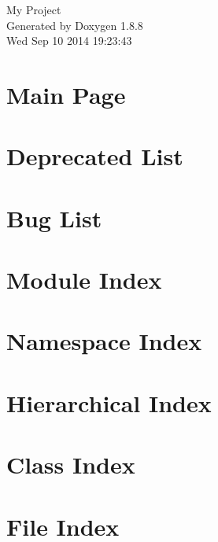 \documentclass[twoside]{book}
\newcommand{\+}{\discretionary{\mbox{\scriptsize$\hookleftarrow$}}{}{}}
\newcommand{\clearemptydoublepage}{%
  \newpage{\pagestyle{empty}\cleardoublepage}%
}
\begin{document}
\hypersetup{pageanchor=false,
             bookmarks=true,
             bookmarksnumbered=true,
             pdfencoding=unicode
            }
\begin{titlepage}
\vspace*{7cm}
\begin{center}%
{\Large My Project }\\
\vspace*{1cm}
{\large Generated by Doxygen 1.8.8}\\
\vspace*{0.5cm}
{\small Wed Sep 10 2014 19:23:43}\\
\end{center}
\end{titlepage}
\clearemptydoublepage
\tableofcontents
\clearemptydoublepage
{}
\hypersetup{pageanchor=true}

\chapter{Main Page}
\label{index}\hypertarget{index}{}
\chapter{Deprecated List}
\label{deprecated}
\hypertarget{deprecated}{}

\chapter{Bug List}
\label{bug}
\hypertarget{bug}{}

\chapter{Module Index}

\chapter{Namespace Index}

\chapter{Hierarchical Index}

\chapter{Class Index}

\chapter{File Index}

\end{document}

